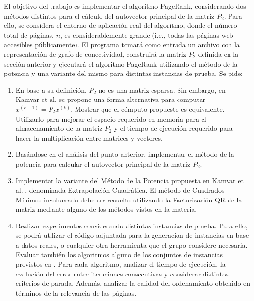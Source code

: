 \documentclass[11pt, a4paper]{article}
\begin{document}
El objetivo del trabajo es implementar el algoritmo PageRank, considerando dos m\'etodos distintos para el c\'alculo del
autovector principal de la matriz $P_2$. Para ello, se considera el entorno de aplicaci\'on real del algoritmo, donde el
n\'umero total de p\'aginas, $n$, es considerablemente grande (i.e., todas las p\'aginas web accesibles p\'ublicamente).
El programa tomar\'a como entrada un archivo con la representaci\'on de grafo de conectividad, construir\'a la matriz
$P_2$ definida en la secci\'on anterior y ejecutar\'a el algoritmo PageRank utilizando el m\'etodo de la potencia y una 
variante del mismo para distintas instancias de prueba. Se pide:

\begin{enumerate}
\item En base a su definici\'on, $P_2$ no es una matriz esparsa. Sin embargo, en Kamvar et al. \cite[Algoritmo
1]{Kamvar2003} se propone una forma alternativa para computar $x^{(k+1)} = P_2 x^{(k)}$. Mostrar que el c\'omputo
propuesto es equivalente. Utilizarlo para mejorar el espacio requerido en memoria para el almacenamiento de la matriz
$P_2$ y el tiempo de ejecuci\'on requerido para hacer la multiplicaci\'on entre matrices y vectores. 

\item Bas\'andose en el an\'alisis del punto anterior, implementar el m\'etodo de la potencia para calcular el
autovector principal de la matriz $P_2$.

\item Implementar la variante del M\'etodo de la Potencia propuesta en Kamvar et al. \cite[Secci\'on 5]{Kamvar2003},
denominada Extrapolaci\'on Cuadr\'atica. El m\'etodo de Cuadrados M\'inimos involucrado debe ser resuelto utilizando la
Factorizaci\'on QR de la matriz mediante alguno de los m\'etodos vistos en la materia.

\item Realizar experimentos considerando distintas instancias de prueba. Para ello, se podr\'a utilizar el c\'odigo
adjuntada para la generaci\'on de instancias en base a datos reales, o cualquier otra herramienta que el grupo considere
necesaria. Evaluar tambi\'en los algoritmos alguno de los conjuntos de instancias
provistos en \cite{SNAP}. Para cada algoritmo, analizar el tiempo de
ejecuci\'on, la evoluci\'on del error entre iteraciones consecutivas y considerar distintos criterios de parada. 
Adem\'as, analizar la calidad del ordenamiento obtenido en t\'erminos de la relevancia de las p\'aginas.
\end{enumerate}
\end{document}
